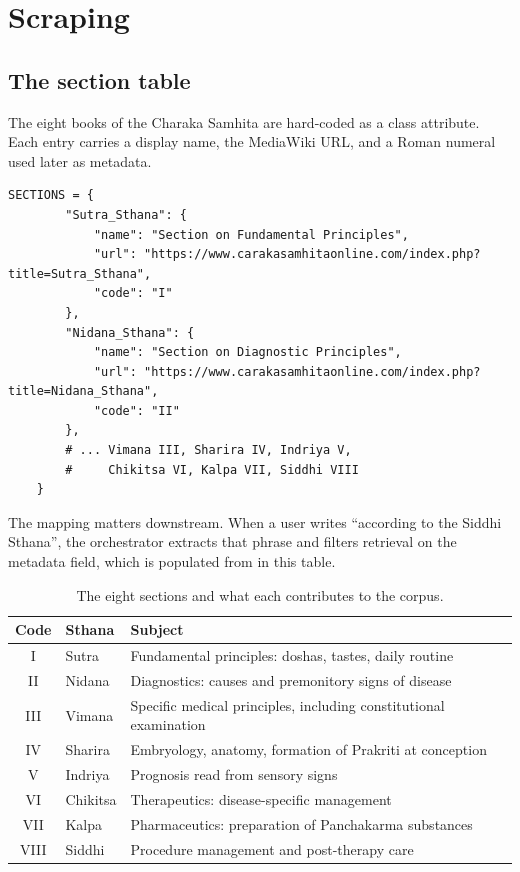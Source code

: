 \section{Scraping}

\subsection{The section table}

The eight books of the Charaka Samhita are hard-coded as a class attribute. Each entry carries a display name, the MediaWiki URL, and a Roman numeral used later as  metadata.

\begin{lstlisting}[style=py,firstnumber=34]
    SECTIONS = {
        "Sutra_Sthana": {
            "name": "Section on Fundamental Principles",
            "url": "https://www.carakasamhitaonline.com/index.php?title=Sutra_Sthana",
            "code": "I"
        },
        "Nidana_Sthana": {
            "name": "Section on Diagnostic Principles",
            "url": "https://www.carakasamhitaonline.com/index.php?title=Nidana_Sthana",
            "code": "II"
        },
        # ... Vimana III, Sharira IV, Indriya V,
        #     Chikitsa VI, Kalpa VII, Siddhi VIII
    }
\end{lstlisting}

The mapping matters downstream. When a user writes ``according to the Siddhi Sthana'', the orchestrator extracts that phrase and filters retrieval on the  metadata field, which is populated from  in this table.

\begin{table}[H]
\centering
\small
\begin{tabularx}{\textwidth}{@{}c l X@{}}
\toprule
\textbf{Code} & \textbf{Sthana} & \textbf{Subject} \\
\midrule
I    & Sutra    & Fundamental principles: doshas, tastes, daily routine \\
II   & Nidana   & Diagnostics: causes and premonitory signs of disease \\
III  & Vimana   & Specific medical principles, including constitutional examination \\
IV   & Sharira  & Embryology, anatomy, formation of Prakriti at conception \\
V    & Indriya  & Prognosis read from sensory signs \\
VI   & Chikitsa & Therapeutics: disease-specific management \\
VII  & Kalpa    & Pharmaceutics: preparation of Panchakarma substances \\
VIII & Siddhi   & Procedure management and post-therapy care \\
\bottomrule
\end{tabularx}
\caption{The eight sections and what each contributes to the corpus.}
\end{table}

